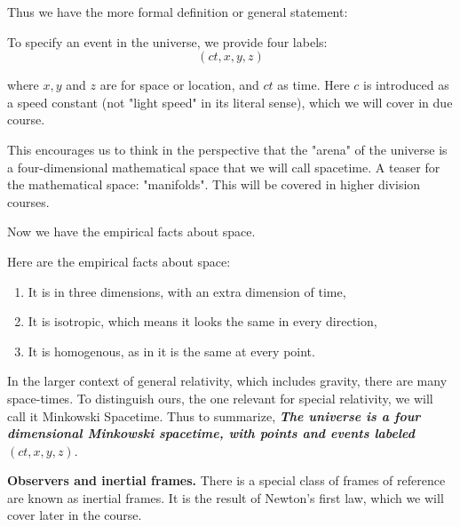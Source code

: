 \documentclass[10pt]{article}
\begin{document}

	Thus we have the more formal definition or general statement:
	\begin{claim}
		To specify an event in the universe, we provide four labels:
		\begin{equation}
		  (ct,x,y,z)
		\end{equation}

		where $x,y$ and $z$ are for space or location, and $ct$ as time. Here $c$ is introduced as a speed constant (not "light speed" in its literal sense), which we will cover in due course.
	\end{claim}

	This encourages us to think in the perspective that the "arena" of the universe is a four-dimensional mathematical space that we will call spacetime. A teaser for the mathematical space: "manifolds". This will be covered in higher division courses.

	\vspace{\baselineskip}
	Now we have the empirical facts about space.
	\begin{claim}
		Here are the empirical facts about space:
		\begin{enumerate}
			\item {It is in three dimensions, with an extra dimension of time,}
			\item {It is isotropic, which means it looks the same in every direction,}
			\item {It is homogenous, as in it is the same at every point.}
		\end{enumerate}
	\end{claim}

	In the larger context of general relativity, which includes gravity, there are many space-times. To distinguish ours, the one relevant for special relativity, we will call it Minkowski Spacetime. Thus to summarize, \textit{\textbf{The universe is a four dimensional Minkowski spacetime, with points and events labeled $(ct,x,y,z)$}}.

	\vspace{2\baselineskip}
	\textbf{Observers and inertial frames.} There is a special class of frames of reference are known as inertial frames. It is the result of Newton's first law, which we will cover later in the course. 
\end{document}

